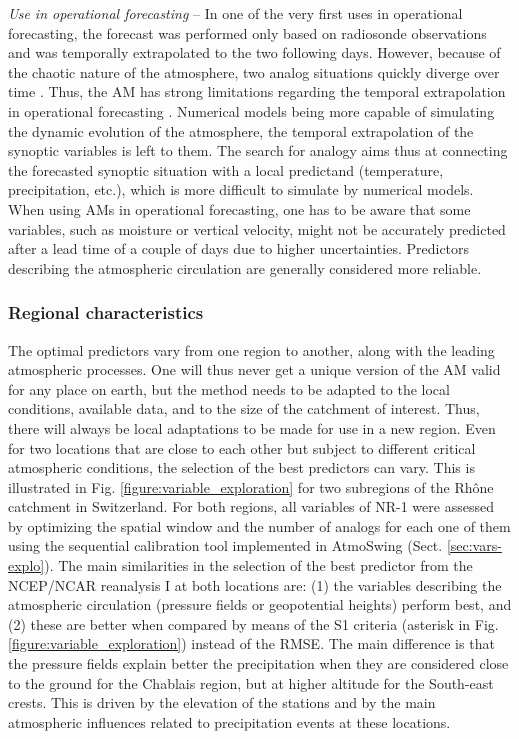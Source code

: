 \documentclass[review]{elsarticle}
\begin{document}
\textit{Use in operational forecasting} -- In one of the very first uses in operational forecasting, the forecast was performed only based on radiosonde observations and was temporally extrapolated to the two following days. However, because of the chaotic nature of the atmosphere, two analog situations quickly diverge over time \citep{Lorenz1969}. Thus, the AM has strong limitations regarding the temporal extrapolation in operational forecasting \citep{Bontron2004}. Numerical models being more capable of simulating the dynamic evolution of the atmosphere, the temporal extrapolation of the synoptic variables is left to them. The search for analogy aims thus at connecting the forecasted synoptic situation with a local predictand (temperature, precipitation, etc.), which is more difficult to simulate by numerical models. When using AMs in operational forecasting, one has to be aware that some variables, such as moisture or vertical velocity, might not be accurately predicted after a lead time of a couple of days due to higher uncertainties. Predictors describing the atmospheric circulation are generally considered more reliable.


\subsubsection{Regional characteristics}

The optimal predictors vary from one region to another, along with the leading atmospheric processes. One will thus never get a unique version of the AM valid for any place on earth, but the method needs to be adapted to the local conditions, available data, and to the size of the catchment of interest. Thus, there will always be local adaptations to be made for use in a new region. Even for two locations that are close to each other but subject to different critical atmospheric conditions, the selection of the best predictors can vary. This is illustrated in Fig. \ref{figure:variable_exploration} for two subregions of the Rh\^{o}ne catchment in Switzerland. For both regions, all variables of NR-1 were assessed by optimizing the spatial window and the number of analogs for each one of them using the sequential calibration tool implemented in AtmoSwing (Sect. \ref{sec:vars-explo}). The main similarities in the selection of the best predictor from the NCEP/NCAR reanalysis I at both locations are: (1) the variables describing the atmospheric circulation (pressure fields or geopotential heights) perform best, and (2) these are better when compared by means of the S1 criteria (asterisk in Fig. \ref{figure:variable_exploration}) instead of the RMSE. The main difference is that the pressure fields explain better the precipitation when they are considered close to the ground for the Chablais region, but at higher altitude for the South-east crests. This is driven by the elevation of the stations and by the main atmospheric influences related to precipitation events at these locations. 
\end{document}
